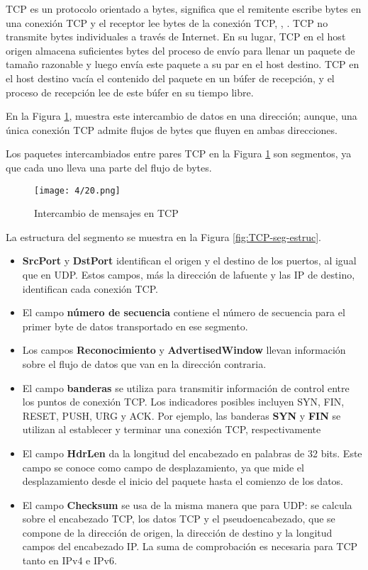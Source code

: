 TCP es un protocolo orientado a bytes, significa que el remitente escribe bytes en una conexión TCP y el receptor lee bytes de la conexión TCP, \cite{Peterson2021}, \cite{Coulouris2011}. 
TCP no transmite bytes individuales a través de Internet.  En su lugar, TCP en el host origen almacena suficientes bytes del proceso de envío para llenar un paquete de tamaño razonable y luego envía este paquete a su par en el host destino. TCP en el host destino  vacía el contenido del paquete en un búfer de recepción, y el proceso de recepción lee de este búfer en su tiempo libre. 

En la Figura \ref{fig:TCP-segmento}, muestra este intercambio de  datos  en una  dirección; aunque,  una única conexión TCP admite flujos de bytes que fluyen en ambas direcciones.

Los paquetes intercambiados entre pares TCP en la Figura \ref{fig:TCP-segmento} son segmentos, ya que cada uno lleva una parte del flujo de bytes.


\begin{figure}  
	 \begin{center}
	\texttt{[image: 4/20.png]}
	\caption{Intercambio de mensajes en TCP}
	\label{fig:TCP-segmento}
\end{center} 
 \end{figure}

 
La estructura del segmento se muestra  en la Figura \ref{fig:TCP-seg-estruc}. 
\begin{itemize}
	\item  \textbf{SrcPort} y \textbf{DstPort} identifican el origen y el destino de los puertos, al igual que en UDP. Estos campos, más la dirección de lafuente y las IP de destino, identifican cada conexión TCP. 
	\item El campo  \textbf{número de secuencia} contiene el número de secuencia para el primer byte de datos 	transportado en ese segmento.
	\item  Los campos \textbf{Reconocimiento} y \textbf{AdvertisedWindow} llevan información sobre el flujo de datos que van en la dirección contraria.
	\item El campo \textbf{banderas}  se utiliza para transmitir información de control entre los puntos de conexión TCP.  Los indicadores posibles incluyen SYN, FIN, RESET, PUSH, URG y
	ACK. Por ejemplo, las banderas \textbf{SYN} y \textbf{FIN} se utilizan al establecer y terminar una conexión TCP, respectivamente
	\item  El campo \textbf{HdrLen} da la longitud del encabezado en palabras de 32 bits. Este campo  se conoce como campo de desplazamiento, ya que mide el desplazamiento desde el inicio del paquete hasta el comienzo de los datos.
	\item El campo \textbf{Checksum} se usa  de la misma manera que para UDP: se calcula sobre el encabezado TCP, los datos TCP y el pseudoencabezado, que se compone de la dirección de origen, la dirección de destino y la longitud 	campos del encabezado IP. La suma de comprobación es necesaria para TCP tanto en IPv4
	e IPv6. 
\end{itemize}

